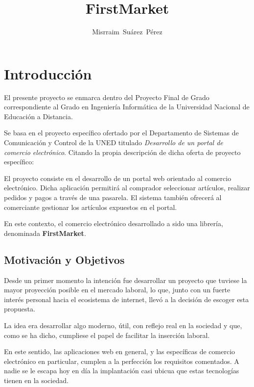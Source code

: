 \documentclass[a4paper]{report}
\author{Misrraim~Su\'arez~P\'erez}
\title{FirstMarket}
\begin{document}
    \maketitle
    \tableofcontents

    \section{Introducción}
    El presente proyecto se enmarca dentro del Proyecto Final de Grado correspondiente al Grado en Ingeniería Informática
    de la Universidad Nacional de Educación a Distancia.

    Se basa en el proyecto específico ofertado por el Departamento de Sistemas de Comunicación y Control de la UNED titulado \emph{Desarrollo de un portal de comercio electrónico}.
    Citando la propia descripción de dicha oferta de proyecto específico:
    
    \begin{displayquote}
        El proyecto consiste en el desarrollo de un portal web orientado al comercio electrónico.
        Dicha aplicación permitirá al comprador seleccionar artículos, realizar pedidos y pagos a través de una pasarela.
        El sistema también ofrecerá al comerciante gestionar los artículos expuestos en el portal.
    \end{displayquote}

	En este contexto, el comercio electrónico desarrollado a sido una librería, denominada \textbf{FirstMarket}.

    \subsection{Motivación y Objetivos}
    Desde un primer momento la intención fue desarrollar un proyecto que tuviese la mayor proyección posible en el mercado laboral, lo que,
    junto con un fuerte interés personal hacia el ecosistema de internet, llevó a la decisión de escoger esta propuesta.

    La idea era desarrollar algo moderno, útil, con reflejo real en la sociedad y que, como se ha dicho, cumpliese el papel de facilitar la inserción laboral.

    En este sentido, las aplicaciones web en general, y las específicas de comercio electrónico en particular, cumplen a la perfección los requisitos comentados.
    A nadie se le escapa hoy en día la implantación casi ubicua que estas tecnologías tienen en la sociedad.
\end{document}
